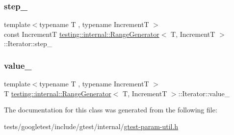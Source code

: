 \subsubsection{\texorpdfstring{step\+\_\+}{step\_}}
{\footnotesize\ttfamily template$<$typename T , typename IncrementT $>$ \\
const IncrementT \hyperlink{classtesting_1_1internal_1_1RangeGenerator}{testing\+::internal\+::\+Range\+Generator}$<$ T, IncrementT $>$\+::Iterator\+::step\+\_\+\hspace{0.3cm}{\ttfamily [private]}}

\mbox{\label{classtesting_1_1internal_1_1RangeGenerator_1_1Iterator_aab59a7070669d64348494a1fb1795934}} 
\subsubsection{\texorpdfstring{value\+\_\+}{value\_}}
{\footnotesize\ttfamily template$<$typename T , typename IncrementT $>$ \\
T \hyperlink{classtesting_1_1internal_1_1RangeGenerator}{testing\+::internal\+::\+Range\+Generator}$<$ T, IncrementT $>$\+::Iterator\+::value\+\_\+\hspace{0.3cm}{\ttfamily [private]}}



The documentation for this class was generated from the following file\+:\begin{DoxyCompactItemize}
\item 
tests/googletest/include/gtest/internal/\hyperlink{gtest-param-util_8h}{gtest-\/param-\/util.\+h}\end{DoxyCompactItemize}
